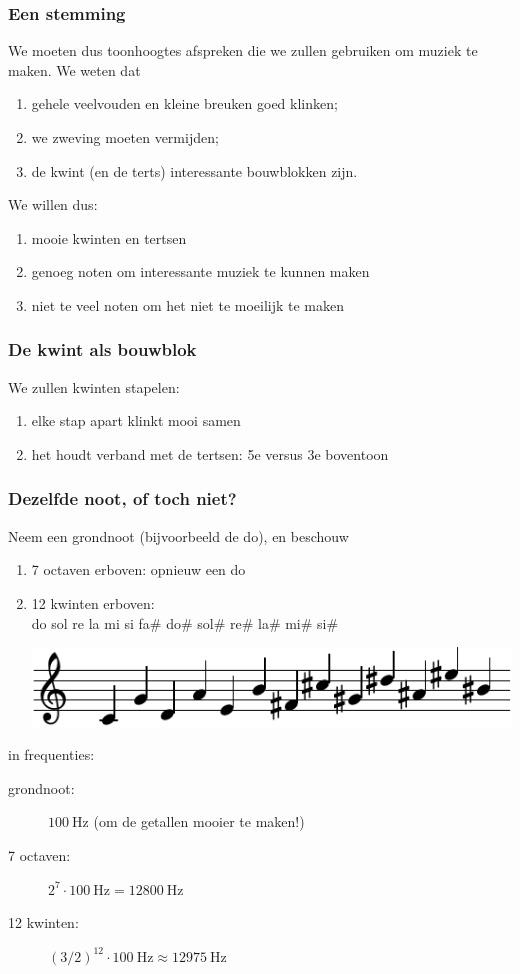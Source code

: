 \documentclass[compress, darktitle, framenumber, totalframenumber]{beamer}
\begin{document}
\begin{frame}
  \frametitle{Een stemming}

  We moeten dus toonhoogtes afspreken die we zullen gebruiken om muziek te maken. We weten dat
  \begin{enumerate}
    \item gehele veelvouden en kleine breuken goed klinken;
    \item we zweving moeten vermijden;
    \item de kwint (en de terts) interessante bouwblokken zijn.
  \end{enumerate}
  \pause
  We willen dus:
  \begin{enumerate}
    \item mooie kwinten en tertsen
    \item genoeg noten om interessante muziek te kunnen maken
    \item niet te veel noten om het niet te moeilijk te maken
  \end{enumerate}
\end{frame}

\begin{frame}
  \frametitle{De kwint als bouwblok}

  We zullen kwinten stapelen:
  \begin{enumerate}
    \item elke stap apart klinkt mooi samen
    \item het houdt verband met de tertsen: 5e versus 3e boventoon
  \end{enumerate}
\end{frame}

\begin{frame}
  \frametitle{Dezelfde noot, of toch niet?}

  Neem een grondnoot (bijvoorbeeld de do), en beschouw
  \begin{enumerate}
    \item 7 octaven erboven: opnieuw een do
      \pause
    \item 12 kwinten erboven: \\
      do sol re la mi si fa\# do\# sol\# re\# la\# mi\# si\#

      \includegraphics{scores/circle-cropped}
  \end{enumerate}
  \pause
  in frequenties:
  \begin{description}
    \item[grondnoot:] $\SI{100}{\hertz}$ (om de getallen mooier te maken!)
    \item[7 octaven:] $2^7\cdot\SI{100}{\hertz}=\SI{12800}{\hertz}$ 
      \pause
    \item[12 kwinten:] $(3/2)^{12}\cdot\SI{100}{\hertz}\approx\SI{12975}{\hertz}$
  \end{description}
\end{frame}
\end{document}
